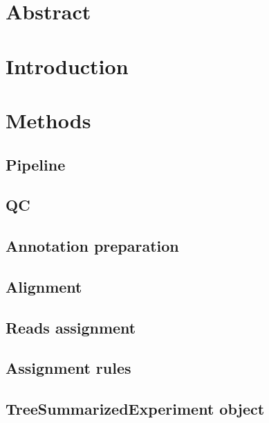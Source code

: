 \documentclass[12pt,twoside]{reedthesis}
\begin{document}
\hypertarget{abstract-2}{%
\section{Abstract}\label{abstract-2}}

\hypertarget{introduction-2}{%
\section{Introduction}\label{introduction-2}}

\hypertarget{methods-2}{%
\section{Methods}\label{methods-2}}

\hypertarget{pipeline}{%
\subsection{Pipeline}\label{pipeline}}

\hypertarget{qc}{%
\subsection{QC}\label{qc}}

\hypertarget{annotation-preparation}{%
\subsection{Annotation preparation}\label{annotation-preparation}}

\hypertarget{alignment}{%
\subsection{Alignment}\label{alignment}}

\hypertarget{reads-assignment}{%
\subsection{Reads assignment}\label{reads-assignment}}

\hypertarget{assignment-rules}{%
\subsection{Assignment rules}\label{assignment-rules}}

\hypertarget{treesummarizedexperiment-object}{%
\subsection{TreeSummarizedExperiment object}\label{treesummarizedexperiment-object}}
\end{document}
